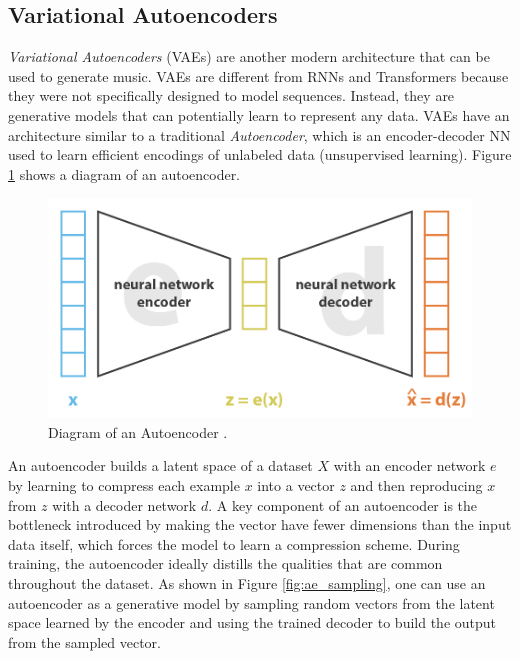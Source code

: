 
\subsection{Variational Autoencoders}

\textit{Variational Autoencoders} (VAEs) \cite{kingma2013auto} are another modern architecture that can be used to generate music. VAEs are different from RNNs and Transformers because they were not specifically designed to model sequences. Instead, they are generative models that can potentially learn to represent any data. VAEs have an architecture similar to a traditional \textit{Autoencoder}, which is an encoder-decoder NN used to learn efficient encodings of unlabeled data (unsupervised learning). Figure \ref{fig:ae} shows a diagram of an autoencoder.

\begin{figure}[!h]
 \centering
 \includegraphics[width=0.8\columnwidth]{imgs/background/autoencoder.png}
 \caption{Diagram of an Autoencoder \cite{rocca2019understanding}.}
 \label{fig:ae}
\end{figure}

An autoencoder builds a latent space of a dataset $X$ with an encoder network $e$ by learning to compress each example $x$ into a vector $z$ and then reproducing $x$ from $z$ with a decoder network $d$. A key component of an autoencoder is the bottleneck introduced by making the vector have fewer dimensions than the input data itself, which forces the model to learn a compression scheme. During training, the autoencoder ideally distills the qualities that are common throughout the dataset. As shown in Figure \ref{fig:ae_sampling}, one can use an autoencoder as a generative model by sampling random vectors from the latent space learned by the encoder and using the trained decoder to build the output from the sampled vector.

